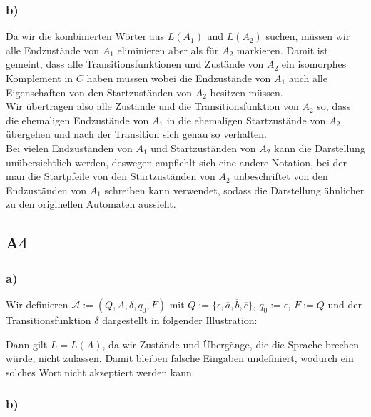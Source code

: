 \documentclass[12pt, a4paper]{article}
\begin{document}
\begin{doublespace}

\subsubsection*{b)}
Da wir die kombinierten Wörter aus \(L(A_1)\) und \(L(A_2)\) suchen, müssen wir alle Endzustände von \(A_1\) eliminieren aber als   für \(A_2\) markieren. Damit ist gemeint, dass alle Transitionsfunktionen und Zustände von \(A_2\) ein isomorphes Komplement in \(C\) haben müssen wobei die Endzustände von \(A_1\) auch alle Eigenschaften von den Startzuständen von \(A_2\) besitzen müssen. \\
Wir übertragen also alle Zustände und die Transitionsfunktion von \(A_2\) so, dass die ehemaligen Endzustände von \(A_1\) in die ehemaligen Startzustände von \(A_2\) übergehen und nach der Transition sich genau so verhalten. \\
Bei vielen Endzuständen von \(A_1\) und Startzuständen von \(A_2\) kann die Darstellung unübersichtlich werden, deswegen empfiehlt sich eine andere Notation, bei der man die Startpfeile von den Startzuständen von \(A_2\) unbeschriftet von den Endzuständen von \(A_1\) schreiben kann verwendet, sodass die Darstellung ähnlicher zu den originellen Automaten aussieht. \pagebreak
\subsection*{A4}
\subsubsection*{a)}
Wir definieren \(\mathcal A := (Q, A, \delta, q_0, F)\) mit \(Q := \{\epsilon, \overline{a}, \overline{b}, \overline{c}\}\), \(q_0 := \epsilon\), \(F := Q\) und der Transitionsfunktion \(\delta\) dargestellt in folgender Illustration:
\begin{center}
\end{center}
Dann gilt \(L = L(A)\), da wir Zustände und Übergänge, die die Sprache brechen würde, nicht zulassen. Damit bleiben falsche Eingaben undefiniert, wodurch ein solches Wort nicht akzeptiert werden kann.
\subsubsection*{b)}

\end{doublespace}
\end{document}
